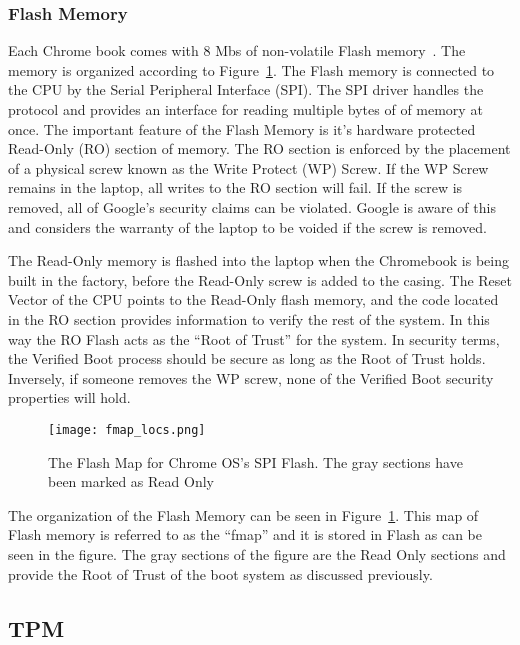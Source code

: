 \documentclass[../report.tex]{subfiles}
\begin{document}
\subsubsection{Flash Memory}

Each Chrome book comes with 8 Mbs of non-volatile Flash memory~\cite{fw-summit}.
The memory is organized according to Figure~\ref{fig:fmap}. 
The Flash memory is connected to the CPU by the Serial Peripheral Interface (SPI).
The SPI driver handles the protocol and provides an interface for reading multiple bytes of of memory at once.
The important feature of the Flash Memory is it's hardware protected Read-Only (RO) section of memory.
The RO section is enforced by the placement of a physical screw known as the Write Protect (WP) Screw.
If the WP Screw remains in the laptop, all writes to the RO section will fail.
If the screw is removed, all of Google's security claims can be violated. 
Google is aware of this and considers the warranty of the laptop to be voided if the screw is removed.

The Read-Only memory is flashed into the laptop when the Chromebook is being built in the factory, before the Read-Only screw is added to the casing. 
The Reset Vector of the CPU points to the Read-Only flash memory, and the code located in the RO section provides information to verify the rest of the system.
In this way the RO Flash acts as the ``Root of Trust'' for the system.
In security terms, the Verified Boot process should be secure as long as the Root of Trust holds.
Inversely, if someone removes the WP screw, none of the Verified Boot security properties will hold.

\begin{figure}
  \centering
  \texttt{[image: fmap\_locs.png]}
  \caption{The Flash Map for Chrome OS's SPI Flash. The gray sections have been marked as Read Only~\cite{fw-summit}}
  \label{fig:fmap}
\end{figure}

The organization of the Flash Memory can be seen in Figure~\ref{fig:fmap}.
This map of Flash memory is referred to as the ``fmap'' and it is stored in Flash as can be seen in the figure.
The gray sections of the figure are the Read Only sections and provide the Root of Trust of the boot system as discussed previously.

\subsection{TPM}
\end{document}
